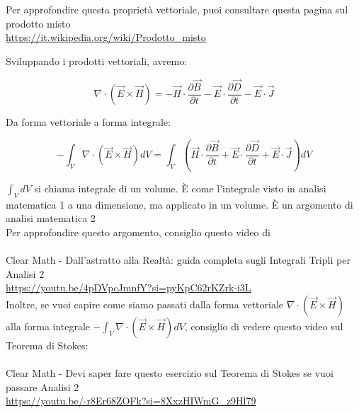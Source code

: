 \begin{tcolorbox}
    Per approfondire questa proprietà vettoriale, puoi consultare questa pagina sul prodotto misto \\
    \url{https://it.wikipedia.org/wiki/Prodotto_misto}
\end{tcolorbox}

Sviluppando i prodotti vettoriali, avremo:  

{
    \Large
    \begin{equation}
    \nabla \cdot (\vec{E} \times \vec{H}) = - \vec{H} \cdot \frac{\partial \vec{B}}{\partial t} - \vec{E} \cdot \frac{\partial \vec{D}}{\partial t} - \vec{E} \cdot \vec{J}       
    \end{equation}
}

Da forma vettoriale a forma integrale: 

{
    \Large
    \begin{equation}
        - \int_V \nabla \cdot (\vec{E} \times \vec{H}) dV = 
        \int_V (\vec{H} \cdot \frac{\partial \vec{B}}{\partial t} + \vec{E} \cdot \frac{\partial \vec{D}}{\partial t} + \vec{E} \cdot \vec{J}) dV
    \end{equation}
}

\begin{tcolorbox}
    
    $\int_V dV$ si chiama integrale di un volume. È come l'integrale visto in analisi matematica 1 a una dimensione, 
    ma applicato in un volume. È un argomento di analisi matematica 2 \\   
    
    Per approfondire questo argomento,  consiglio questo video di \\ \\ 
    Clear Math -  Dall'astratto alla Realtà: guida completa sugli Integrali Tripli per Analisi 2 \\ 
    \url{https://youtu.be/4pDVpcJmnfY?si=pyKpC62rKZrk-i3L} \\ 

    Inoltre, se vuoi capire come siamo passati dalla forma vettoriale $\nabla \cdot (\vec{E} \times \vec{H})$ 
    alla forma integrale $- \int_V \nabla \cdot (\vec{E} \times \vec{H}) dV$, consiglio di vedere questo video 
    sul Teorema di Stokes:  \\ \\ 
    Clear Math - Devi saper fare questo esercizio sul Teorema di Stokes se vuoi passare Analisi 2 \\ 
    \url{https://youtu.be/-r8Er68ZOFk?si=8XxzHIWmG_z9Hl79}

    
    
\end{tcolorbox} 

